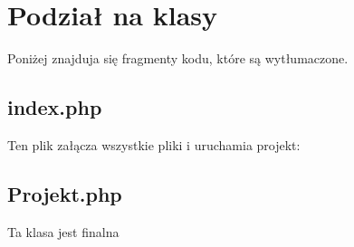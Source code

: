 \newcommand{\mytitle}{Piłka nożna - Katalog  (Aplikacja PHP)}
\newcommand{\myauthor}{Jakub Achtelik, Oliwier Budnik}
\newcommand{\mydate}{Koszalin, 10 Grudnia 2023}
\newcommand{\school}{Politechnika Koszalińska}
\newcommand{\subject}{Zastosowawanie Programowania Obiektowego}
\newcommand{\subjectyear}{Informatyka III Semestr}
\newcommand{\footleft}{\thepage}
\newcommand{\footrigt}{ZPO - \subjectyear}
\newcommand{\footcenter}{\myauthor}



 

    
    

    \newpage

    \section{Podział na klasy}
        Poniżej znajduja się fragmenty kodu, które są wytłumaczone.
        \subsection{index.php}
            Ten plik załącza wszystkie pliki i uruchamia projekt:
              

        \pagebreak
        
        \subsection{Projekt.php}
            Ta klasa jest finalna
            
            


    



